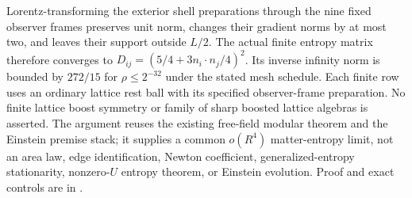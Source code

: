Lorentz-transforming the exterior shell preparations through the nine
fixed observer frames preserves unit norm, changes their gradient norms
by at most two, and leaves their support outside $L/2$.
The actual finite entropy matrix therefore converges to
$D_{ij}=(5/4+3n_i\cdot n_j/4)^2$.
Its inverse infinity norm is bounded by $272/15$ for
$\rho\leq2^{-32}$ under the stated mesh schedule.
Each finite row uses an ordinary lattice rest ball with its specified
observer-frame preparation.  No finite lattice boost symmetry or family
of sharp boosted lattice algebras is asserted.
The argument reuses the existing free-field modular theorem and the
Einstein premise stack; it supplies a common $o(R^4)$ matter-entropy
limit, not an area law, edge identification, Newton coefficient,
generalized-entropy stationarity, nonzero-$U$ entropy theorem, or Einstein
evolution.  Proof and exact controls are in
.
